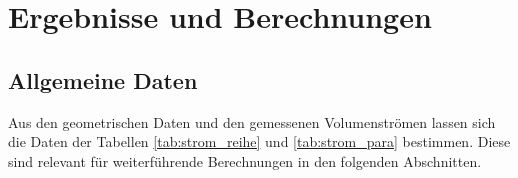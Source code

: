 \section{Ergebnisse und Berechnungen}
\label{sec:ergebnisse}

\subsection{Allgemeine Daten}
Aus den geometrischen Daten und den gemessenen Volumenströmen lassen sich die Daten der Tabellen \ref{tab:strom_reihe} und \ref{tab:strom_para} bestimmen. Diese sind relevant für weiterführende Berechnungen in den folgenden Abschnitten.

\begin{table}[h!]
	\renewcommand*{\arraystretch}{1.2}
	\centering
	\caption{Strömungsrelevante Größen der Reihenschaltung}
	\label{tab:strom_reihe}
\end{table}%
\FloatBarrier

\begin{table}[h!]
	\renewcommand*{\arraystretch}{1.2}
	\centering
	\caption{Strömungsrelevante Größen der Parallelschaltung}
	\label{tab:strom_para}
\end{table}%
\FloatBarrier

